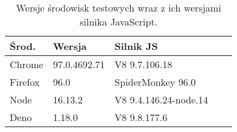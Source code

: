 
\begin{wraptable}{r}{9cm}
    \setlength{\tabcolsep}{0.5em}
    \caption{Wersje środowisk testowych wraz z ich wersjami silnika JavaScript.}
    \label{tab:versions}
    \begin{tabular}{lllll}%
        \hline
        Środ.     & Wersja      & Silnik JS           \\
        \hline
        Chrome  & 97.0.4692.71 & V8 9.7.106.18            \\
        Firefox & 96.0         & SpiderMonkey  96.0       \\
        Node    & 16.13.2      & V8    9.4.146.24-node.14 \\
        Deno    & 1.18.0       & V8      9.8.177.6        \\
        \hline
    \end{tabular}
\end{wraptable}
